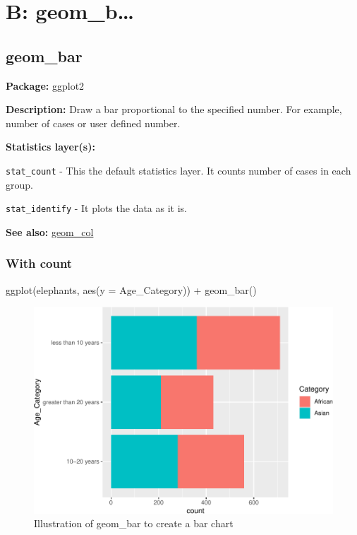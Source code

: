 \documentclass[
]{book}
\newenvironment{Shaded}{\begin{snugshade}}{\end{snugshade}}
\newcommand{\AttributeTok}[1]{\textcolor[rgb]{0.77,0.63,0.00}{#1}}
\newcommand{\FunctionTok}[1]{\textcolor[rgb]{0.00,0.00,0.00}{#1}}
\newcommand{\NormalTok}[1]{#1}
\newcommand{\SpecialCharTok}[1]{\textcolor[rgb]{0.00,0.00,0.00}{#1}}
\begin{document}
\hypertarget{b-geom_b}{%
\chapter{B: geom\_b\ldots{}}\label{b-geom_b}}

\hypertarget{geom_bar}{%
\section{geom\_bar}\label{geom_bar}}

\textbf{Package: } ggplot2 \autocite{R-ggplot2}

\textbf{Description: } Draw a bar proportional to the specified number. For example, number of cases or user defined number.

\textbf{Statistics layer(s): }

\texttt{stat\_count} - This the default statistics layer. It counts number of cases in each group.

\texttt{stat\_identify} - It plots the data as it is.

\textbf{See also: } \protect\hyperlink{col}{geom\_col}

\hypertarget{with-count}{%
\subsection{With count}\label{with-count}}

\begin{Shaded}
\begin{Highlighting}[]
\FunctionTok{ggplot}\NormalTok{(elephants, }\FunctionTok{aes}\NormalTok{(}\AttributeTok{y =}\NormalTok{ Age\_Category)) }\SpecialCharTok{+} 
  \FunctionTok{geom\_bar}\NormalTok{()}
\end{Highlighting}
\end{Shaded}

\begin{figure}
\centering
\includegraphics{Data-Visualisation-geom-Encyclopedia_files/figure-latex/unnamed-chunk-19-1.pdf}
\caption{\label{fig:unnamed-chunk-19}Illustration of geom\_bar to create a bar chart}
\end{figure}
\end{document}

